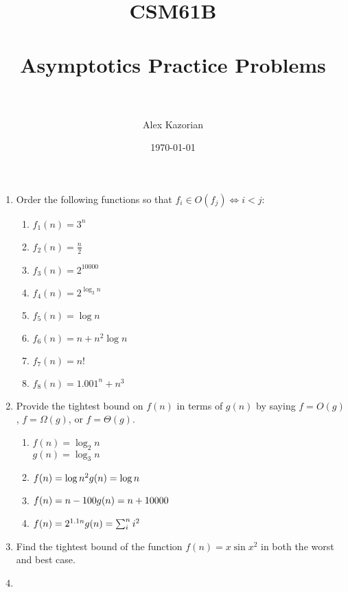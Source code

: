 \documentclass[12pt]{article}
\title{
	\normalfont \normalsize
	\textsc{CSM61B} \\ [25pt] %
	\horrule{0.5pt} \\[0.4cm] %
	\huge Asymptotics Practice Problems \\ %
	\horrule{2pt} \\[0.5cm] %
}
\author{Alex Kazorian} %
\date{\normalsize\today} %
\newenvironment{Questions}[1][Question]
{\begin{enumerate}}
	{\end{enumerate}}
\newcommand{\Question}{\item }
\begin{document}
	\maketitle
	\fontsize{12}{15}
	\selectfont
	\begin{Questions}
	    \Question
        Order the following functions so that $f_i \in O(f_j) \Longleftrightarrow i < j$:
            \begin{enumerate}
                \item $f_1(n) = 3^n$
                \item $f_2(n) = \frac n 2$
                \item $f_3(n) = 2^10000$
                \item $f_4(n) = 2^{\log_2 n}$
                \item $f_5(n) = \log n$
                \item $f_6(n) = n + n^2 \log n$
                \item $f_7(n) = n!$
                \item $f_8(n) = 1.001^n + n^3$
            \end{enumerate}

        \Question
        Provide the tightest bound on $f(n)$ in terms of $g(n)$ by saying $f = O(g)$, $f = \Omega(g)$, or $f = \Theta(g)$.
            \begin{enumerate}
                \item $f(n) = \log_2 n$ \\
                      $g(n) = \log_3 n$
                \item $f(n) = \log n^2 \\
                       g(n) = \log n$
                \item $f(n) = n - 100 \\
                       g(n) = n + 10000$
                \item $f(n) = 2^{1.1n} \\
                       g(n) = \sum_i^n i^2$
            \end{enumerate}

        \Question
        Find the tightest bound of the function $f(n) = x \sin x^2$ in both the worst and best case.

        \Question
        

	\end{Questions}
\end{document}
